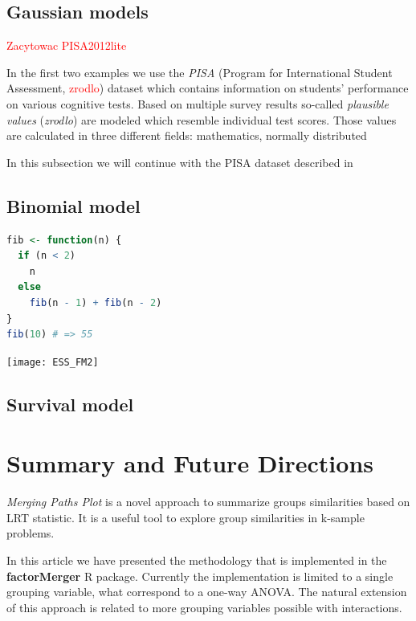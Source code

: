 \documentclass[12pt]{article}
\newcommand{\factorMerger}{\textbf{factorMerger }}
\newcommand{\todo}{\textcolor{red}}
\begin{document}
\subsection{Gaussian models}
\label{subsec:gauss}

\todo{Zacytowac PISA2012lite}

In the first two examples we use the \emph{PISA} (Program for International Student Assessment, 
\cite{pisa2012} \todo{zrodlo}) dataset which contains information on students' performance on various cognitive tests. Based on multiple survey results so-called \emph{plausible values} (\emph{zrodlo}) are modeled which resemble individual test scores. Those values are calculated in three different fields: mathematics,  normally distributed 

In this subsection we will continue with the PISA dataset described in 

\subsection{Binomial model}
\label{subsec:binom}

\begin{lstlisting}[language=R]
fib <- function(n) {
  if (n < 2)
    n
  else
    fib(n - 1) + fib(n - 2)
}
fib(10) # => 55
\end{lstlisting}

\texttt{[image: ESS\_FM2]}

\subsection{Survival model}
\label{subsec:surv}


\section{Summary and Future Directions}
\label{sec:summ}

\emph{Merging Paths Plot} is a novel approach to summarize groups similarities based on LRT statistic. It is a useful tool to explore group similarities in k-sample problems.

In this article we have presented the methodology that is implemented in the \factorMerger R package.  Currently the implementation is limited to a single grouping variable, what correspond to a one-way ANOVA. The natural extension of this approach is related to more grouping variables possible with interactions. 
\end{document}

